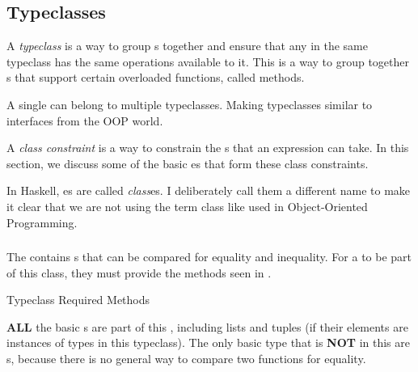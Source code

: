 \subsection{Typeclasses}\label{subsec:Typeclasses}
\begin{definition}[Typeclass]\label{def:Typeclass}
  A \emph{typeclass} is a way to group s together and ensure that any  in the same typeclass has the same operations available to it.
  This is a way to group together s that support certain overloaded functions, called methods.

  A single  can belong to multiple typeclasses.
  Making typeclasses similar to interfaces from the OOP world.

  \begin{remark}\label{rmk:Class_Constraint}
    A \emph{class constraint} is a way to constrain the s that an expression can take.
    In this section, we discuss some of the basic es that form these class constraints.
  \end{remark}

  \begin{remark}\label{rmk:Class_vs_Typeclass}
    In Haskell, es are called \emph{class}es.
    I deliberately call them a different name to make it clear that we are not using the term class like used in Object-Oriented Programming.
  \end{remark}
\end{definition}

\subsubsection{\texorpdfstring{}{\texttt{Eq}}}\label{subsubsec:Eq_Typeclass}
The   contains s that can be compared for equality and inequality.
For a  to be part of this class, they must provide the methods seen in .

\begin{listing}[h!tbp]
\caption{ Typeclass Required Methods}
\label{lst:Eq_Typeclass_Methods}
\end{listing}

\textbf{ALL} the basic s are part of this , including lists and tuples (if their elements are instances of types in this typeclass).
The only basic type that is \textbf{NOT} in this  are s, because there is no general way to compare two functions for equality.

